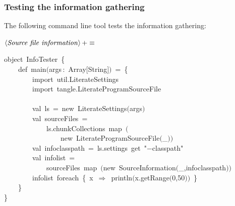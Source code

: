 \documentclass[a4paper,12pt]{article}
\begin{document}



\subsubsection{Testing the information gathering}
The following command line tool tests the information gathering:

$\left<\mbox{\emph{Source file information}}\right>+\equiv$
\begin{program}{\vem object}~InfoTester~{\small\{}
\\~~~~{\vem def}~main$($args\,{\rm :}~Array$[$String$]$$)$~=~{\small\{}
\\~~~~~~~~{\vem import}~util.LiterateSettings
\\~~~~~~~~{\vem import}~tangle.LiterateProgramSourceFile
\\[0.5em]
\\~~~~~~~~{\vem val}~ls~=~{\vem new}~LiterateSettings$($args$)$
\\[0.5em]~~~~~~~~{\vem val}~sourceFiles~=
\\~~~~~~~~~~~~ls.chunkCollections~map~$($
\\~~~~~~~~~~~~~~~~{\vem new}~LiterateProgramSourceFile$($\_$)$$)$
\\[0.5em]~~~~~~~~{\vem val}~infoclasspath~=~ls.settings~get~"$-$classpath"
\\[0.5em]~~~~~~~~{\vem val}~infolist~=
\\~~~~~~~~~~~~sourceFiles~map~$(${\vem new}~SourceInformation$($\_,infoclasspath$)$$)$
\\[0.5em]~~~~~~~~infolist~foreach~{\small\{}~x~$\Rightarrow$~println$($x.getRange$($0,50$)$$)$~{\small\}}
\\~~~~{\small\}}
\\{\small\}}
\\[0.5em]\end{program}
\end{document}
